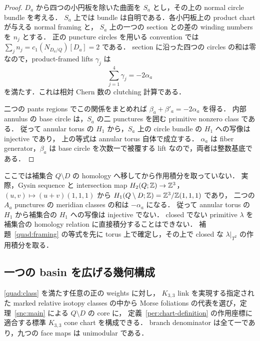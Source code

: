 \begin{proof}
$D_a$ から四つの小円板を除いた曲面を $S_a$ とし，その上の normal circle bundle を考える．
$S_a$ 上では bundle は自明である．各小円板上の product chart が与える normal framing と，
$S_a$ 上の一つの section との差の winding numbers を $n_j$ とする．
正の puncture circles を用いる convention では
$\sum_jn_j=c_1(N_{D_a/Q})[D_a]=2$ である．
section に沿った四つの circles の和は零なので，product-framed lifts $\gamma_j$ は
\[
 \sum_{j=1}^4\gamma_j=-2\alpha_a
\]
を満たす．これは相対 Chern 数の clutching 計算である．

二つの pants regions でこの関係をまとめれば
$\beta_a+\beta'_a=-2\alpha_a$ を得る．
内部 annulus の base circle は，$S_a$ の二 punctures を囲む primitive nonzero class である．
従って annular torus の $H_1$ から，$S_a$ 上の circle bundle の $H_1$ への写像は injective であり，
上の等式は annular torus 自体で成立する．
$\alpha_a$ は fiber generator，$\beta_a$ は base circle を次数一で被覆する lift なので，両者は整数基底である．
\end{proof}

ここでは補集合 $Q\setminus D$ の homology へ移してから作用積分を取っていない．
実際，Gysin sequence と intersection map
$H_2(Q;\mathbb Z)\to\mathbb Z^3$，$(u,v)\mapsto(u+v)(1,1,1)$ から
$H_1(Q\setminus D;\mathbb Z)=\mathbb Z^3/\mathbb Z(1,1,1)$ であり，
二つの $A_a$ punctures の meridian classes の和は $-\alpha_a$ になる．
従って annular torus の $H_1$ から補集合の $H_1$ への写像は injective でない．
closed でない primitive $\lambda$ を補集合の homology relation に直接積分することはできない．
補題~\ref{quad:framing} の等式を先に torus 上で確定し，その上で closed な
$\lambda|_{T^2}$ の作用積分を取る．

\subsection{一つの basin を広げる幾何構成}

\begin{theorem}\label{quad:realization}
\eqref{quad:class} を満たす任意の正の weights に対し，
$K_{3,3}$ link を実現する指定された marked relative isotopy classes の中から
Morse foliations の代表を選び，定理~\ref{snc:main} による $Q\setminus D$ の core に，
定義~\ref{per:chart-definition} の作用座標に適合する標準 $K_{3,3}$ cone chart を構成できる．
branch denominator は全て一であり，九つの face maps は unimodular である．
\end{theorem}

